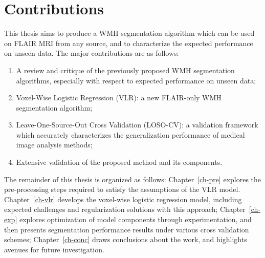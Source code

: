 \section{Contributions}
This thesis aims to produce a WMH segmentation algorithm
which can be used on FLAIR MRI from any source,
and to characterize the expected performance on unseen data.
The major contributions are as follows:
\begin{enumerate}
  \item A review and critique of the previously proposed WMH segmentation algorithms,
  especially with respect to expected performance on unseen data;
  \item Voxel-Wise Logistic Regression (VLR): a new FLAIR-only WMH segmentation algorithm;
  \item Leave-One-Source-Out Cross Validation (LOSO-CV): a validation framework
  which accurately characterizes the generalization performance of medical image analysis methods;
  \item Extensive validation of the proposed method and its components.
\end{enumerate}
The remainder of this thesis is organized as follows:
Chapter~\ref{ch-pre} explores the pre-processing steps
required to satisfy the assumptions of the VLR model.
Chapter~\ref{ch-vlr} develops the voxel-wise logistic regression model,
including expected challenges and regularization solutions with this approach;
Chapter~\ref{ch-exp} explores optimization of model components through experimentation,
and then presents segmentation performance results under various cross validation schemes;
Chapter~\ref{ch-conc} draws conclusions about the work,
and highlights avenues for future investigation.
